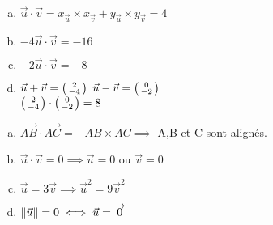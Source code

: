 \documentclass[12pt, a4paper]{article}
\DeclarePairedDelimiter\norm{\lVert}{\rVert}
\begin{document}
\begin{Exercise}[number={58}]
    \begin{enumerate}[a)]
        \item $\vec{u}\cdot\vec{v}=x_{\vec{u}}\times x_{\vec{v}}+y_{\vec{u}}\times y_{\vec{v}}=4$
        \item $-4\vec{u}\cdot\vec{v}=-16$
        \item $-2\vec{u}\cdot\vec{v}=-8$
        \item $\vec{u}+\vec{v}=\begin{psmallmatrix}2\\-4\end{psmallmatrix}$ \quad $\vec{u}-\vec{v}=\begin{psmallmatrix}0\\-2\end{psmallmatrix}$ \smallskip \\ $\begin{psmallmatrix}2\\-4\end{psmallmatrix}\cdot\begin{psmallmatrix}0\\-2\end{psmallmatrix}=8$
    \end{enumerate}
\end{Exercise}

\begin{Exercise}[number={60}]
    \begin{enumerate}[a)]
        \item $\overrightarrow{AB}\cdot\overrightarrow{AC}=-AB\times AC\implies$ A,B et C sont alignés.
        \item $\vec{u}\cdot\vec{v}=0\implies\vec{u}=0$ ou $\vec{v}=0$
        \item $\vec{u}=3\vec{v}\implies\vec{u}^2=9\vec{v}^2$
        \item $\norm{\vec{u}}=0\iff\vec{u}=\overrightarrow{0}$
    \end{enumerate}
\end{Exercise}
\end{document}
